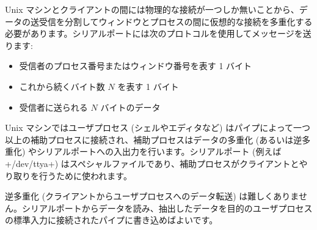 Unix マシンとクライアントの間には物理的な接続が一つしか無いことから、データの送受信を分割してウィンドウとプロセスの間に仮想的な接続を多重化する必要があります。シリアルポートには次のプロトコルを使用してメッセージを送ります:

%
\begin{itemize}
\item 受信者のプロセス番号またはウィンドウ番号を表す 1 バイト
\item これから続くバイト数 $N$ を表す 1 バイト
\item 受信者に送られる $N$ バイトのデータ
\end{itemize}
%
Unix マシンではユーザプロセス (シェルやエディタなど) はパイプによって一つ以上の補助プロセスに接続され、補助プロセスはデータの多重化 (あるいは逆多重化) やシリアルポートへの入出力を行います。シリアルポート (例えば \ml+/dev/ttya+) はスペシャルファイルであり、補助プロセスがクライアントとやり取りを行うために使われます。

逆多重化 (クライアントからユーザプロセスへのデータ転送) は難しくありません。シリアルポートからデータを読み、抽出したデータを目的のユーザプロセスの標準入力に接続されたパイプに書き込めばよいです。
%

